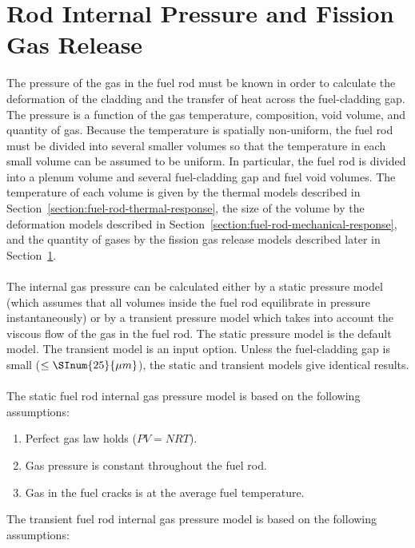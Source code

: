 \section{Rod Internal Pressure and Fission Gas Release}\label{section:rod-internal-pressure-and-fission-gas-release}

The pressure of the gas in the fuel rod must be known in order to calculate the deformation of the
cladding and the transfer of heat across the fuel-cladding gap. The pressure is a function of the
gas temperature, composition, void volume, and quantity of gas. Because the temperature is spatially
non-uniform, the fuel rod must be divided into several smaller volumes so that the temperature in
each small volume can be assumed to be uniform. In particular, the fuel rod is divided into a plenum
volume and several fuel-cladding gap and fuel void volumes. The temperature of each volume is given
by the thermal models described in Section~\ref{section:fuel-rod-thermal-response}, the size of the
volume by the deformation models described in Section~\ref{section:fuel-rod-mechanical-response},
and the quantity of gases by the fission gas release models described later in
Section~\ref{section:rod-internal-pressure-and-fission-gas-release}.
\\
\\
The internal gas pressure can be calculated either by a static pressure model (which assumes that
all volumes inside the fuel rod equilibrate in pressure instantaneously) or by a transient pressure
model which takes into account the viscous flow of the gas in the fuel rod. The static pressure
model is the default model. The transient model is an input option. Unless the fuel-cladding gap is
small ($\leq \SInum{25}{\mu m}$), the static and transient models give identical results.
\\
\\
The static fuel rod internal gas pressure model is based on the
following assumptions:

\begin{enumerate}
    \item Perfect gas law holds ($PV = NRT$).
    \item Gas pressure is constant throughout the fuel rod.
    \item Gas in the fuel cracks is at the average fuel temperature.
\end{enumerate}

The transient fuel rod internal gas pressure model is based on the
following assumptions:

